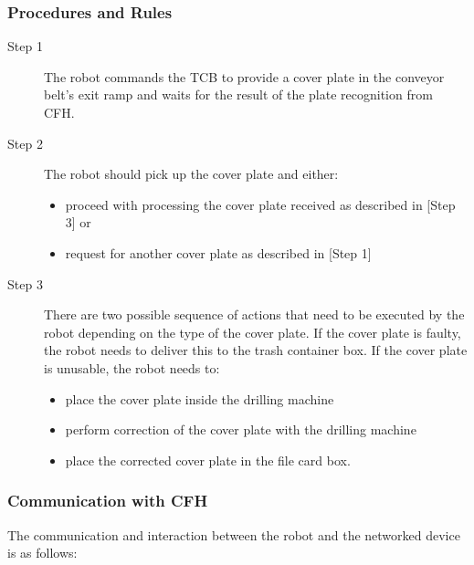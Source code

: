 \subsubsection{Procedures and Rules}
\label{sssec:TaskPlateDrillingProcedures}
 \begin{description}
     \item [Step 1] The robot commands the TCB to provide a cover plate in the conveyor belt's exit ramp and waits for the result of the plate recognition from CFH.
     \item [Step 2] The robot should pick up the cover plate and either:
	     \begin{itemize}
	     	\item proceed with processing the cover plate received as described in [Step 3] or
	     	\item request for another cover plate as described in [Step 1]
	     	\end{itemize}
     \item [Step 3] There are two possible sequence of actions that need to be executed by the robot depending on the type of the cover plate. If the cover plate is faulty, the robot needs to deliver this to the trash container box. If the cover plate is unusable, the robot needs to:
     	\begin{itemize}
     		\item place the cover plate inside the drilling machine
     		\item perform correction of the cover plate with the drilling machine
     		\item place the corrected cover plate in the file card box.
     	\end{itemize}
\end{description} 

\subsubsection{Communication with CFH}
\label{sssec:CommCFHPlateDrilling}

The communication and interaction between the robot and the networked device is as follows:

